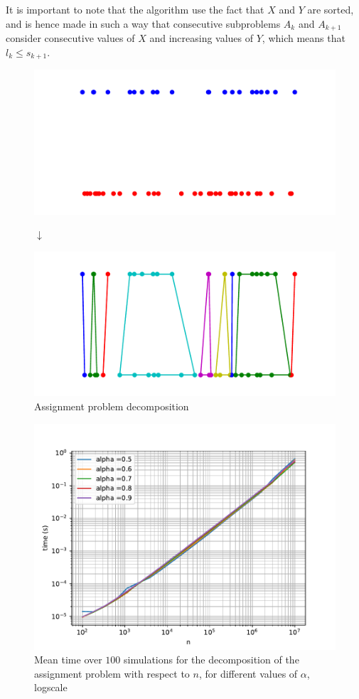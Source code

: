 \documentclass[a4paper,12pt]{article}
\begin{document}
It is important to note that the algorithm use the fact that $X$ and $Y$ are sorted, and is hence made in such a way that consecutive subproblems $A_k$ and $A_{k+1}$ consider consecutive values of $X$ and increasing values of $Y$, which means that $l_k \leqslant s_{k+1}$.

\begin{figure}[H]
\includegraphics[width = \columnwidth]{before_decomp.pdf}
\begin{center}
$\downarrow$
\end{center}
\includegraphics[width = \columnwidth]{decomp_fig.pdf}
\caption{Assignment problem decomposition}\label{decomp_fig}
\end{figure}

\begin{figure}[H]
\includegraphics[width = \columnwidth]{decomp_time.pdf}
\caption{Mean time over $100$ simulations for the decomposition of the assignment problem with respect to $n$, for different values of $\alpha$, logscale}\label{decomp_time}
\end{figure}
\end{document}

